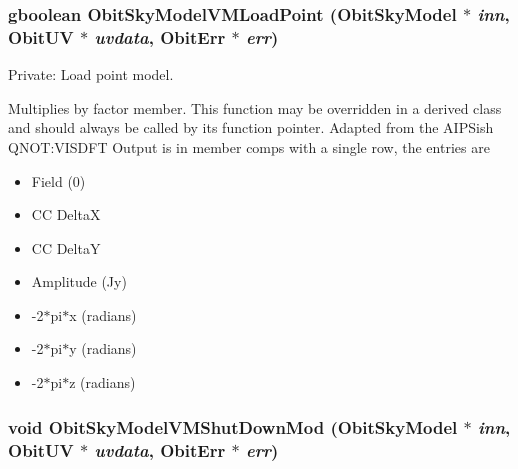 \subsubsection{\setlength{\rightskip}{0pt plus 5cm}gboolean Obit\-Sky\-Model\-VMLoad\-Point ({\bf Obit\-Sky\-Model} $\ast$ {\em inn}, {\bf Obit\-UV} $\ast$ {\em uvdata}, {\bf Obit\-Err} $\ast$ {\em err})}\label{ObitSkyModelVM_8c_a10}


Private: Load point model. 

Multiplies by factor member. This function may be overridden in a derived class and should always be called by its function pointer. Adapted from the AIPSish QNOT:VISDFT Output is in member comps with a single row, the entries are \begin{itemize}
\item Field (0) \item CC Delta\-X \item CC Delta\-Y \item Amplitude (Jy) \item -2$\ast$pi$\ast$x (radians) \item -2$\ast$pi$\ast$y (radians) \item -2$\ast$pi$\ast$z (radians) 
\end{itemize}
\subsubsection{\setlength{\rightskip}{0pt plus 5cm}void Obit\-Sky\-Model\-VMShut\-Down\-Mod ({\bf Obit\-Sky\-Model} $\ast$ {\em inn}, {\bf Obit\-UV} $\ast$ {\em uvdata}, {\bf Obit\-Err} $\ast$ {\em err})}\label{ObitSkyModelVM_8c_a17}


